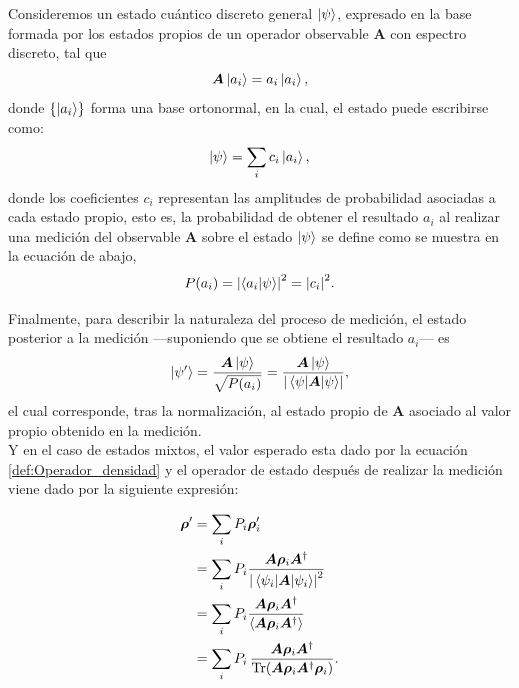 \documentclass[../Main.tex]{subfiles}
\begin{document}
Consideremos un estado cuántico discreto general $\ket{\psi}$, expresado en la base formada por los estados propios de un operador observable $\bm A$ con espectro discreto, tal que
\begin{equation}
    \bm A \ket{a_i} = a_i \ket{a_i},
\end{equation}
donde $\qty{\ket{a_i}}$ forma una base ortonormal, en la cual, el estado puede escribirse como:
\begin{equation}
    \ket{\psi}=\sum_i c_i \ket{a_i},
    \label{eq: estado_general}
\end{equation}
donde los coeficientes $c_i$ representan las amplitudes de probabilidad asociadas a cada estado propio, esto es, la probabilidad de obtener el resultado $a_i$ al realizar una medición del observable $\bm A$ sobre el estado $\ket{\psi}$ se define como se muestra en la ecuación de abajo, \cite{Cohen}
\begin{equation}
    P(a_i)=\abs{\ip{a_i}{\psi}}^2=\abs{c_i}^2.
    \label{def: probabilidad_estado}
\end{equation}

Finalmente, para describir la naturaleza del proceso de medición, el estado posterior a la medición —suponiendo que se obtiene el resultado $a_i$— es
\begin{equation}
    \ket{\psi'}=
    \frac{\bm A \ket{\psi}}
     {\sqrt{P(a_i)}}=\frac{\bm{A}\ket{\psi}}{\abs{\expval{\bm{A}}{\psi}}},
    \label{eq: colapso_estado}
\end{equation}
el cual corresponde, tras la normalización, al estado propio de $\bm A$ asociado al valor propio obtenido en la medición.\\

Y en el caso de estados mixtos, el valor esperado esta dado por la ecuación \eqref{def:Operador_densidad} y el operador de estado después de realizar la medición viene dado por la siguiente expresión:

\begin{align}
    \bm{\rho} ' &= 
    \sum_i P_i \bm{\rho}_i ' \notag\\
    &= \sum_iP_i\frac{\bm{A}\bm{\rho}_i\bm{A}^\dagger}{\abs{\expval{\bm{A}}{\psi_i}}^2}\notag\\
    &= \sum_i P_i \frac{\bm{A}\bm{\rho}_i\bm{A}^\dagger}{\expval{\bm{A}\bm{\rho}_i\bm{A}^\dagger}}\notag\\
    &=\sum_i P_i \,\frac{\bm{A}\bm{\rho}_i\bm{A}^\dagger}{\Tr(\bm{A}\bm{\rho}_i\bm{A}^\dagger\bm{\rho}_i)}.
\end{align}
\end{document}
